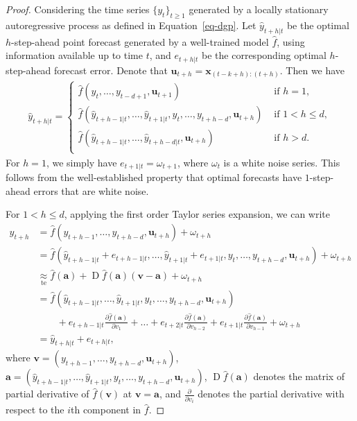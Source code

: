 \documentclass[
  11pt,
  a4paper,
]{article}
\theoremstyle{plain}
\theoremstyle{remark}
\begin{document}
\begin{proof}
Considering the time series \(\{y_t\}_{t\geq1}\) generated by a locally
stationary autoregressive process as defined in Equation~\ref{eq-dgp}.
Let \(\hat{y}_{t+h|t}\) be the optimal \(h\)-step-ahead point forecast
generated by a well-trained model \(\hat{f}\), using information
available up to time \(t\), and \(e_{t+h|t}\) be the corresponding
optimal \(h\)-step-ahead forecast error. Denote that
\(\bm{u}_{t+h}=\bm{x}_{(t-k+h):(t+h)}\). Then we have \begin{align*}
\hat{y}_{t+h|t}=\begin{cases}
      \hat{f}(y_t,\dots,y_{t-d+1},\bm{u}_{t+1}) & \text{ if } h=1, \\
      \hat{f}(\hat{y}_{t+h-1|t},\dots,\hat{y}_{t+1|t},y_t,\dots,y_{t+h-d},\bm{u}_{t+h}) &  \text{ if } 1 < h \leq d, \\
      \hat{f}(\hat{y}_{t+h-1|t},\dots,\hat{y}_{t+h-d|t},\bm{u}_{t+h}) & \text{ if } h > d.\\
    \end{cases}
\end{align*} For \(h=1\), we simply have \(e_{t+1|t} = \omega_{t+1}\),
where \(\omega_t\) is a white noise series. This follows from the
well-established property that optimal forecasts have \(1\)-step-ahead
errors that are white noise.

For \(1<h\leq d\), applying the first order Taylor series expansion, we
can write \begin{align*}
y_{t+h}
&= \hat{f}(y_{t+h-1},\dots,y_{t+h-d},\bm{u}_{t+h})+\omega_{t+h} \\
&= \hat{f}(\hat{y}_{t+h-1|t}+e_{t+h-1|t},\dots,\hat{y}_{t+1|t}+e_{t+1|t},y_{t},\dots,y_{t+h-d},\bm{u}_{t+h})+\omega_{t+h} \\
&\underset{\text{te}}{\approx} \hat{f}(\bm{a})+\operatorname{D}\hat{f}(\bm{a})(\bm{v}-\bm{a})+
\omega_{t+h} \\
&= \hat{f}(\hat{y}_{t+h-1|t},\dots,\hat{y}_{t+1|t},y_{t},\dots,y_{t+h-d},\bm{u}_{t+h}) \\
&\mbox{}\qquad +e_{t+h-1|t}\frac{\partial \hat{f}(\bm{a})}{\partial v_1}+\dots+e_{t+2|t}\frac{\partial \hat{f}(\bm{a})}{\partial v_{h-2}}+e_{t+1|t}\frac{\partial \hat{f}(\bm{a})}{\partial v_{h-1}}+\omega_{t+h} \\
&=\hat{y}_{t+h|t}+e_{t+h|t},
\end{align*} where \(\bm{v}=(y_{t+h-1},\dots,y_{t+h-d},\bm{u}_{t+h})\),
\(\bm{a} =(\hat{y}_{t+h-1|t},\dots,\hat{y}_{t+1|t},y_{t},\dots,y_{t+h-d},\bm{u}_{t+h})\),
\(\operatorname{D}\hat{f}(\bm{a})\) denotes the matrix of partial
derivative of \(\hat{f}(\bm{v})\) at \(\bm{v}=\bm{a}\), and
\(\frac{\partial}{\partial v_i}\) denotes the partial derivative with
respect to the \(i\)th component in \(\hat{f}\).


\end{proof}
\end{document}
